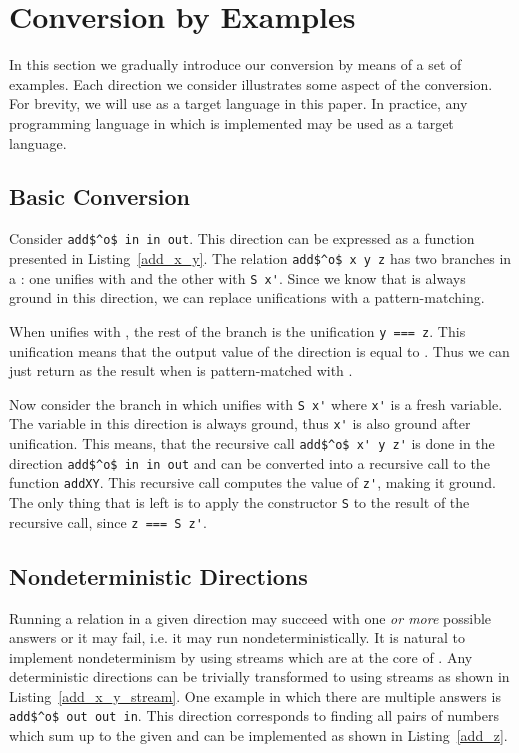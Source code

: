 \section{Conversion by Examples}

In this section we gradually introduce our conversion by means of a set of examples.
Each direction we consider illustrates some aspect of the conversion.
For brevity, we will use \haskell as a target language in this paper.
In practice, any programming language in which \mk is implemented may be used as a target language.


\subsection{Basic Conversion}

Consider \lstinline{add$^o$ in in out}.
This direction can be expressed as a function presented in Listing~\ref{add_x_y}.
The relation \lstinline{add$^o$ x y z} has two branches in a \conde: one unifies \x with \zero and the other with \lstinline{S x'}.
Since we know that \x is always ground in this direction, we can replace unifications with a pattern-matching.

When \x unifies with \zero, the rest of the \conde branch is the unification \lstinline{y === z}.
This unification means that the output value of the direction is equal to \y.
Thus we can just return \y as the result when \x is pattern-matched with \zero.

Now consider the \conde branch in which \x unifies with \lstinline{S x'} where \lstinline{x'} is a fresh variable.
The variable \x in this direction is always ground, thus \lstinline{x'} is also ground after unification.
This means, that the recursive call \lstinline{add$^o$ x' y z'} is done in the direction \lstinline{add$^o$ in in out} and can be converted into a recursive call to the function \lstinline{addXY}.
This recursive call computes the value of \lstinline{z'}, making it ground.
The only thing that is left is to apply the constructor \lstinline{S} to the result of the recursive call, since \lstinline{z === S z'}.




\subsection{Nondeterministic Directions}

Running a relation in a given direction may succeed with one \emph{or more} possible answers or it may fail, i.e. it may run nondeterministically.
It is natural to implement nondeterminism by using streams which are at the core of \mk.
Any deterministic directions can be trivially transformed to using streams as shown in Listing~\ref{add_x_y_stream}.
One example in which there are multiple answers is \lstinline{add$^o$ out out in}.
This direction corresponds to finding all pairs of numbers which sum up to the given \z and can be implemented as shown in Listing~\ref{add_z}.

